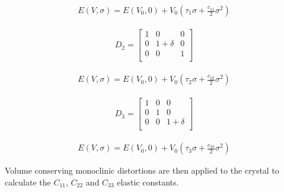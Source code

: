 \documentclass[12pt,twoside]{manual}
\begin{document}
  \begin{equation}
    \begin{split}
    E(V,\sigma) = E(V_{0},0) + V_{0} \left( \tau_{1} \sigma + \frac{c_{11}}{2} \sigma^2 \right)
    \end{split}
  \end{equation}


  \begin{equation}
    \begin{split}
      D_{2} = 
      \begin{bmatrix}
      1          & 0           & 0             \\
      0          & 1 + \delta  & 0             \\
      0          & 0           & 1             \\
      \end{bmatrix}
    \end{split}
  \end{equation}

  \begin{equation}
    \begin{split}
    E(V,\sigma) = E(V_{0},0) + V_{0} \left( \tau_{2} \sigma + \frac{c_{22}}{2} \sigma^2 \right)
    \end{split}
  \end{equation}



  \begin{equation}
    \begin{split}
      D_{3} = 
      \begin{bmatrix}
      1          & 0           & 0             \\
      0          & 1           & 0             \\
      0          & 0           & 1 + \delta    \\
      \end{bmatrix}
    \end{split}
  \end{equation}

  \begin{equation}
    \begin{split}
    E(V,\sigma) = E(V_{0},0) + V_{0} \left( \tau_{3} \sigma + \frac{c_{33}}{2} \sigma^2 \right)
    \end{split}
  \end{equation}


Volume conserving monoclinic distortions are then applied to the crystal to calculate the $C_11$, $C_22$ and $C_33$ elastic constants.
\end{document}
